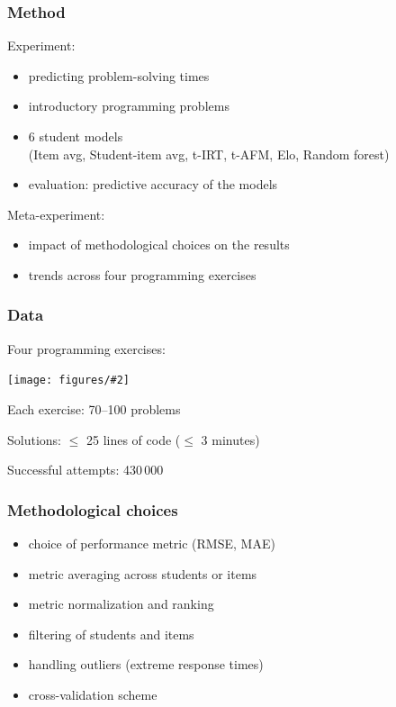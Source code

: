 \documentclass[bigger]{beamer}
\newcommand{\img}[2]{
  \begin{center}
    \texttt{[image: figures/\#2]}
  \end{center}
}
\begin{document}
\begin{frame}
  \frametitle{Method} %

  Experiment:  %
  \begin{itemize}
    \item predicting problem-solving times
    \item introductory programming problems
    \item 6 student models\\
    {\footnotesize (Item avg, Student-item avg, t-IRT, t-AFM, Elo, Random forest)}
    \item evaluation: predictive accuracy of the models %
  \end{itemize}

  \pause

  Meta-experiment:  %
  \begin{itemize}
    \item impact of methodological choices on the results %
    \item trends across four programming exercises
  \end{itemize}

\end{frame}


\begin{frame}
  \frametitle{Data}

  Four programming exercises:
  \img{1.0}{exercises}

  Each exercise: 70--100 problems

  Solutions: $\leq$ 25 lines of code ($\leq$ 3 minutes)

  Successful attempts: 430\,000 %


\end{frame}


\begin{frame}
  \frametitle{Methodological choices}
  \begin{itemize}
    \item choice of performance metric (RMSE, MAE)
    \item metric averaging across students or items
    \item metric normalization and ranking
    \item filtering of students and items
    \item handling outliers (extreme response times) %
    \item cross-validation scheme  %
  \end{itemize}


\end{frame}
\end{document}
